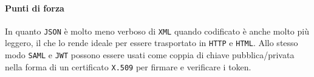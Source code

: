     \paragraph{Punti di forza}
        In quanto \texttt{JSON} è molto meno verboso di \texttt{XML} quando codificato è anche molto più leggero, il che lo rende ideale per essere trasportato in \texttt{HTTP} e \texttt{HTML}. Allo stesso modo \texttt{SAML} e \texttt{JWT} possono essere usati come coppia di chiave pubblica/privata nella forma di un certificato \texttt{X.509} per firmare e verificare i token.